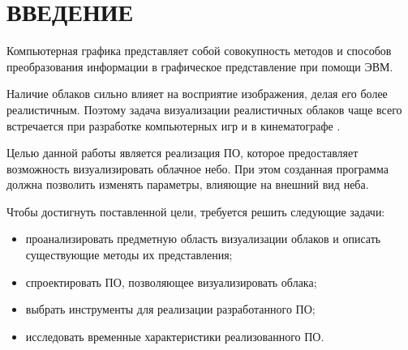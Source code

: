 \chapter*{ВВЕДЕНИЕ}

Компьютерная графика представляет собой совокупность методов
и способов преобразования информации в графическое представление при
помощи ЭВМ.

Наличие облаков сильно влияет на восприятие изображения, делая его более реалистичным. Поэтому задача визуализации реалистичных облаков чаще всего встречается при разработке компьютерных игр и в кинематографе \cite{oz, hzd, frostbite}. 

Целью данной работы является реализация ПО, которое предоставляет возможность визуализировать облачное небо. При этом созданная программа должна позволить изменять параметры, влияющие на внешний вид неба.

Чтобы достигнуть поставленной цели, требуется решить следующие задачи:

\begin{itemize}
	\item проанализировать предметную область визуализации облаков и описать существующие методы их представления;
	\item спроектировать ПО, позволяющее визуализировать облака;
	\item выбрать инструменты для реализации разработанного ПО;
	\item исследовать временные характеристики реализованного ПО.
\end{itemize}